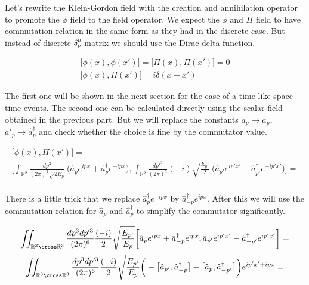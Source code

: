 Let's rewrite the Klein-Gordon field with the creation and annihilation operator to promote the $\phi$ field to the field operator. We expect
the $\phi$ and $\Pi$ field to have commutation relation in the same form as they had in the discrete case. But instead of discrete $\delta^{\mu}_{\nu}$ matrix
we should use the Dirac delta function.

\begin{equation*}
    \begin{gathered}
        \big[\phi(x), \phi(x')] = \big[\Pi(x), \Pi(x')] = 0 \\
        \big[\phi(x), \Pi(x')] = i \delta(x - x')
    \end{gathered}
\end{equation*}

The first one will be shown in the next section for the case of a time-like space-time events. The second one can be calculated
directly using the scalar field obtained in the previous part. But we will replace the constants $a_{p} \to \hat{a}_{p}$, 
$a'_{p} \to \hat{a}^{\dagger}_{p}$ and check whether the choice is fine by the commutator value.

\begin{equation*}
    \begin{gathered}
        \big[\phi(x), \Pi(x')] = \\
        \bigg[
            \int_{\mathbb{R}^{3}} \frac{dp^{3}}{(2 \pi)^{3} \sqrt{2 E_{p}}} \ \big(\hat{a}_{p} e^{i p x} + \hat{a}^{\dagger}_{p} e^{- i p x}\big),
            \int_{\mathbb{R}^{3}} \frac{dp'^{3}}{(2 \pi)^{3}} (-i) \sqrt{\frac{E_{p'}}{2}} \ \big(\hat{a}_{p'} e^{i p' x'} - \hat{a}^{\dagger}_{p'} e^{- i p' x'}\big)
        \bigg] = \\
    \end{gathered}
\end{equation*}

There is a little trick that we replace $\hat{a}^{\dagger}_{p} e^{- i p x}$ by $\hat{a}^{\dagger}_{-p} e^{i p x}$. After this we will
use the commutation relation for $\hat{a}_{p}$ and $\hat{a}^{\dagger}_{p}$ to simplify the commutator significantly.

\begin{equation*}
    \begin{gathered}
        \iint_{\mathbb{R}^{3} \cross \mathbb{R}^{3}} \frac{dp^{3} dp'^{3}}{(2 \pi)^{6}} \frac{(-i)}{2} \sqrt{\frac{E_{p'}}{E_{p}}}
        \bigg[
            \hat{a}_{p} e^{i p x} + \hat{a}^{\dagger}_{-p} e^{i p x},
            \hat{a}_{p'} e^{i p' x'} - \hat{a}^{\dagger}_{-p'} e^{i p' x'}
        \bigg] = \\
        \iint_{\mathbb{R}^{3} \cross \mathbb{R}^{3}} \frac{dp^{3} dp'^{3}}{(2 \pi)^{6}} \frac{(-i)}{2} \sqrt{\frac{E_{p'}}{E_{p}}}
        \bigg(
           - \big[ \hat{a}_{p'}, \hat{a}^{\dagger}_{-p} \big]
           - \big[ \hat{a}_{p}, \hat{a}^{\dagger}_{-p'} \big] 
        \bigg) e^{i p' x' + i p x}=
    \end{gathered}
\end{equation*}

